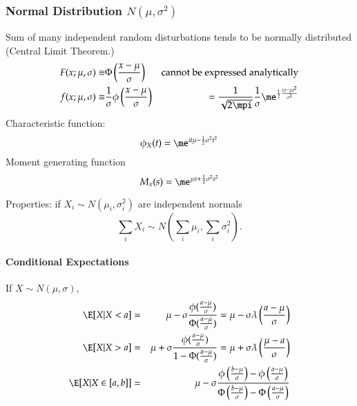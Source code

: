 \documentclass[a4paper]{article}
\numberwithin{equation}{subsection}
\begin{document}
\subsubsection{Normal Distribution $N(\mu,\sigma^2)$}
Sum of many independent random disturbations tends to be normally
distributed (Central Limit Theorem.)
\begin{align}
  F(x; \mu, \sigma) \equiv & 
  \Phi\left( \frac{x - \mu}{\sigma} \right)
  &
  \text{cannot be expressed analytically}
  \\
  f(x; \mu, \sigma) \equiv & 
  \frac{1}{\sigma} \phi\left( \frac{x - \mu}{\sigma} \right)
  &=
  \frac{1}{\sqrt{2 \mpi}}\frac{1}{\sigma}
  \me^{\scriptstyle\frac{1}{2}\frac{(x - \mu)^2}{\sigma^2}}
\end{align}
Characteristic function:
\begin{equation}
  \phi_{X}(t) = \me^{i t \mu - \frac{1}{2}\sigma^2 t^2}
\end{equation}
Moment generating function
\begin{equation}
M_x (s) = \me^{\mu s + \frac{1}{2}{\sigma^2 s^2}}
\end{equation}

Properties: if $X_{i} \sim N(\mu_{i}, \sigma_{i}^{2})$ are
independent normals
\begin{equation}
  \sum_{i} X_{i} \sim 
  N \left(\sum_{i} \mu_{i}, \sum_{i} \sigma_{i}^{2} \right).
\end{equation}

\paragraph{Conditional Expectations}
If $X \sim N(\mu, \sigma)$, 
\begin{eqnarray}
\E [X|X < a ]
&=&
 \mu - \sigma \frac {\phi( \frac{a - \mu}{\sigma} )} {\Phi(
   \frac{a - \mu}{\sigma})}
 =
 \mu - \sigma\lambda \left( \frac{a - \mu}{\sigma} \right)
\\
\E [X|X>a ]
&=&
\mu + \sigma \frac {\phi( \frac{a - \mu}{\sigma} )} 
{1 - \Phi(\frac{a - \mu}{\sigma})}
=
\mu + \sigma \lambda \left( \frac{ \mu - a}{\sigma} \right)
\\
\E [X|X \in [a,b]]
&=&
 \mu - \sigma \frac
 {\phi \left( \frac{b - \mu}{\sigma} \right) - 
   \phi\left( \frac{a - \mu}{\sigma}\right)}
 {\Phi\left(\frac{b - \mu}{\sigma}\right) - 
   \Phi\left(\frac{a - \mu}{\sigma}\right)}
\end{eqnarray}
\end{document}
